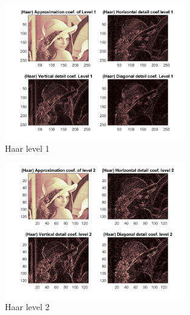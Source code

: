 \documentclass[12pt]{article}
\begin{document}
\begin{enumerate}[1]
\begin{enumerate}
    \begin{figure}[H]
        \centering
        \includegraphics[width=0.7\textwidth,height=0.7\textwidth]{Figures/Haar1.png}
        \caption{Haar level 1}
        \label{Q4_a_level1}
    \end{figure}
    \begin{figure}[H]
        \centering
        \includegraphics[width=0.7\textwidth,height=0.7\textwidth]{Figures/Haar2.png}
        \caption{Haar level 2}
        \label{Q4_a_level2}
    \end{figure}


\end{enumerate}
\end{enumerate}
\end{document}
